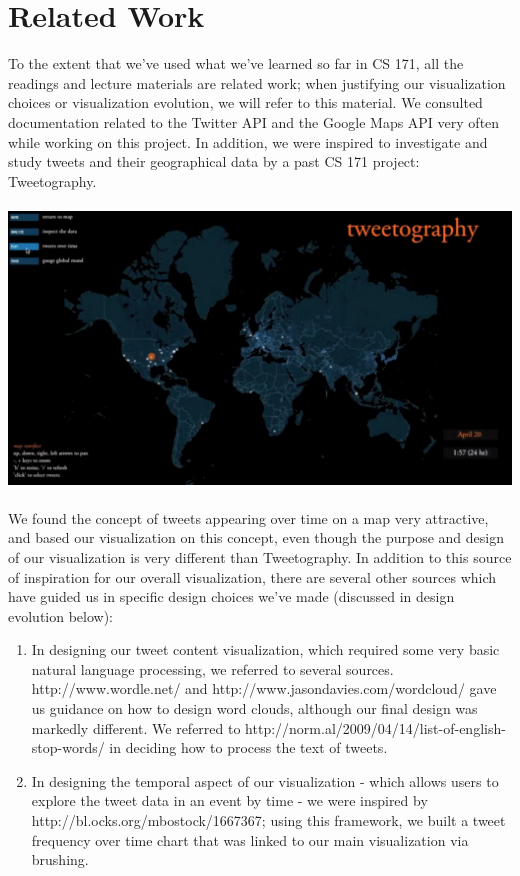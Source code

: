 \documentclass[pdftex,12pt,a4paper]{article}
\begin{document}
\section{Related Work}
To the extent that we've used what we've learned so far in CS 171, all the readings and lecture materials are related work; when justifying our visualization choices or visualization evolution, we will refer to this material. We consulted documentation related to the Twitter API and the Google Maps API very often while working on this project. In addition, we were inspired to investigate and study tweets and their geographical data by a past CS 171 project: Tweetography. \\ \\
\includegraphics[width=5.5in]{tweetography.png} \\ \\
We found the concept of tweets appearing over time on a map very attractive, and based our visualization on this concept, even though the purpose and design of our visualization is very different than Tweetography.
In addition to this source of inspiration for our overall visualization, there are several other sources which have guided us in specific design choices we've made (discussed in design evolution below):
\begin{enumerate}
\item In designing our tweet content visualization, which required some very basic natural language processing, we referred to several sources. \\ http://www.wordle.net/ and http://www.jasondavies.com/wordcloud/ gave us guidance on how to design word clouds, although our final design was markedly different. We referred to http://norm.al/2009/04/14/list-of-english-stop-words/ in deciding how to process the text of tweets.
\item In designing the temporal aspect of our visualization - which allows users to explore the tweet data in an event by time - we were inspired by http://bl.ocks.org/mbostock/1667367; using this framework, we built a tweet frequency over time chart that was linked to our main visualization via brushing. 
\end{enumerate}
\end{document}
